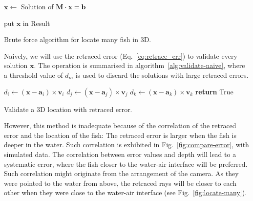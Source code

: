 \documentclass[11pt,twoside]{report}
\begin{document}
\begin{algorithm}
	 {
	 {
	 {
	$\mathbf{x} \gets $ Solution of $\bf M \cdot x = b$\;
	
		{put $\mathbf{x}$ in Result}
	}}}

\caption{Brute force algorithm for locate many fish in 3D.}
\label{alg:locate-3d}
\end{algorithm}


Naively, we will use the retraced error (Eq.~\ref{eq:retrace_err}) to validate every solution $\mathbf{x}$. The operation is summarised in algorithm~\ref{alg:validate-naive}, where a threshold value of $d_m$ is used to discard the solutions with large retraced errors.

\begin{algorithm}

$d_i \gets (\mathbf{x} - \mathbf{a}_i) \times \mathbf{v}_i$\;
$d_j \gets (\mathbf{x} - \mathbf{a}_j) \times \mathbf{v}_j$\;
$d_k \gets (\mathbf{x} - \mathbf{a}_k) \times \mathbf{v}_k$\;
	{\textbf{return} True}

\caption{Validate a 3D location with retraced error.}
\label{alg:validate-naive}
\end{algorithm}

However, this method is inadequate because of the correlation of the retraced error and the location of the fish: The retraced error is larger when the fish is deeper in the water. Such correlation is exhibited in Fig.~\ref{fig:compare-error}, with simulated data. The correlation between error values and depth will lead to a systematic error, where the fish closer to the water-air interface will be preferred. Such correlation might originate from the arrangement of the camera. As they were pointed to the water from above, the retraced rays will be closer to each other when they were close to the water-air interface (see Fig.~\ref{fig:locate-many}).
\end{document}
